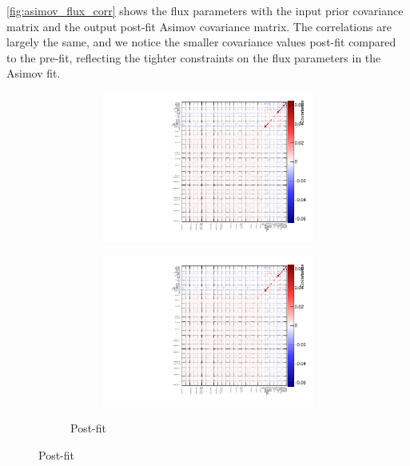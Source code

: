 \autoref{fig:asimov_flux_corr} shows the flux parameters with the input prior covariance matrix and the output post-fit Asimov covariance matrix. The correlations are largely the same, and we notice the smaller covariance values post-fit compared to the pre-fit, reflecting the tighter constraints on the flux parameters in the Asimov fit.
\begin{figure}[h]
	\begin{subfigure}[t]{\textwidth}
	\begin{subfigure}[t]{0.49\textwidth}
		\includegraphics[width=\textwidth, trim={0mm 0mm 0mm 0mm}, clip,page=8]{figures/mach3/Asimov/2017b_NewDet_NewData_Asimov_Long_0_drawCorr.pdf}
	\end{subfigure}
	\begin{subfigure}[t]{0.49\textwidth}
		\includegraphics[width=\textwidth, trim={0mm 0mm 0mm 0mm}, clip,page=9]{figures/mach3/Asimov/2017b_NewDet_NewData_Asimov_Long_0_drawCorr.pdf}
	\end{subfigure}
\caption{Post-fit}
\end{subfigure}


\end{figure}
